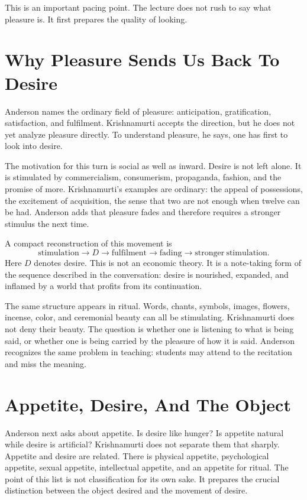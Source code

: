 This is an important pacing point. The lecture does not rush to say what pleasure is. It first prepares the quality of looking.

\section{Why Pleasure Sends Us Back To Desire}

Anderson names the ordinary field of pleasure: anticipation, gratification, satisfaction, and fulfilment. Krishnamurti accepts the direction, but he does not yet analyze pleasure directly. To understand pleasure, he says, one has first to look into desire.

The motivation for this turn is social as well as inward. Desire is not left alone. It is stimulated by commercialism, consumerism, propaganda, fashion, and the promise of more. Krishnamurti's examples are ordinary: the appeal of possessions, the excitement of acquisition, the sense that two are not enough when twelve can be had. Anderson adds that pleasure fades and therefore requires a stronger stimulus the next time.

A compact reconstruction of this movement is
\begin{equation}
\mathrm{stimulation}
\longrightarrow D
\longrightarrow \mathrm{fulfilment}
\longrightarrow \mathrm{fading}
\longrightarrow \mathrm{stronger\ stimulation}.
\end{equation}
Here \(D\) denotes desire. This is not an economic theory. It is a note-taking form of the sequence described in the conversation: desire is nourished, expanded, and inflamed by a world that profits from its continuation.

The same structure appears in ritual. Words, chants, symbols, images, flowers, incense, color, and ceremonial beauty can all be stimulating. Krishnamurti does not deny their beauty. The question is whether one is listening to what is being said, or whether one is being carried by the pleasure of how it is said. Anderson recognizes the same problem in teaching: students may attend to the recitation and miss the meaning.

\section{Appetite, Desire, And The Object}

Anderson next asks about appetite. Is desire like hunger? Is appetite natural while desire is artificial? Krishnamurti does not separate them that sharply. Appetite and desire are related. There is physical appetite, psychological appetite, sexual appetite, intellectual appetite, and an appetite for ritual. The point of this list is not classification for its own sake. It prepares the crucial distinction between the object desired and the movement of desire.

